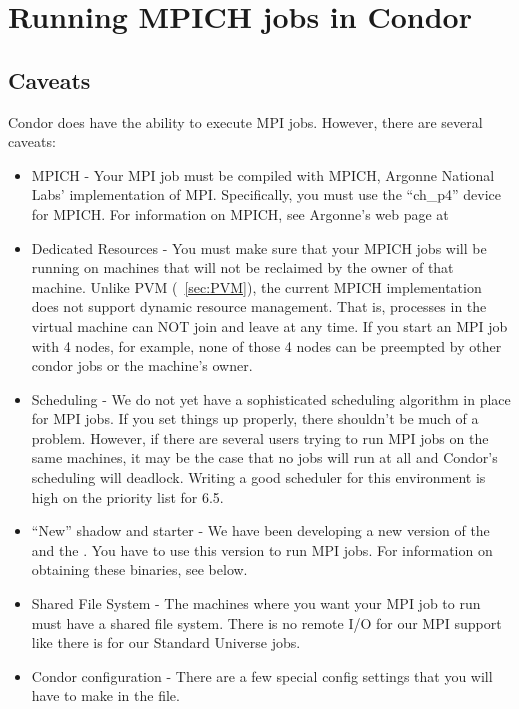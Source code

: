 \section{\label{sec:MPI}Running MPICH jobs in Condor}

\subsection{\label{sec:MPI-caveats}Caveats}

Condor does have the ability to execute MPI jobs.  However, there
are several caveats:

\begin{itemize}

\item{MPICH} - Your MPI job must be compiled with MPICH, Argonne National
Labs' implementation of MPI.  Specifically, you must use the ``ch\_p4'' 
device for MPICH.  For information on MPICH, see Argonne's web page
at 

\item{Dedicated Resources} - You must make sure that your MPICH jobs
will be running on machines that will not be reclaimed by the owner
of that machine.  Unlike PVM (~\ref{sec:PVM}), the current MPICH
implementation does not support dynamic resource management.  That is, 
processes in the virtual machine can NOT join and leave at any time.
If you start an MPI job with 4 nodes, for example, none of those 4 
nodes can be preempted by other condor jobs or the machine's owner.

\item{Scheduling} - We do not yet have a sophisticated scheduling 
algorithm in place for MPI jobs.  If you set things up properly, 
there shouldn't be much of a problem.  However, if there are several
users trying to run MPI jobs on the same machines, it may be the case 
that no jobs will run at all and Condor's scheduling will deadlock.  
Writing a good scheduler for this environment is high on the priority 
list for 6.5.

\item{``New'' shadow and starter} - We have been developing a new version 
of the  and the .  You have to use this
version to run MPI jobs.  For information on obtaining these 
binaries, see below.

\item{Shared File System} - The machines where you want your MPI job
to run must have a shared file system.  There is no remote I/O for
our MPI support like there is for our Standard Universe jobs.

\item{Condor configuration} - There are a few special config settings 
that you will have to make in the  file.

\end{itemize}

